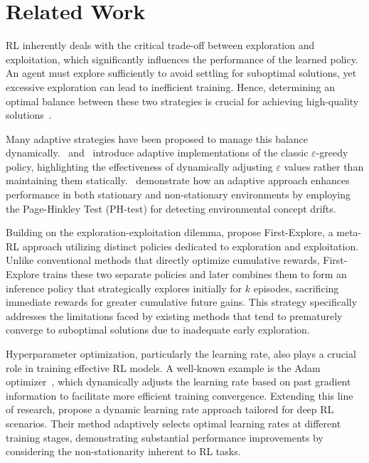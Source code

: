 
\section{Related Work}
\label{sec:related}

\ac{RL} inherently deals with the critical trade-off between exploration and exploitation, which 
significantly influences the performance of the learned policy. An agent must explore sufficiently to 
avoid settling for suboptimal solutions, yet excessive exploration can lead to inefficient training. 
Hence, determining an optimal balance between these two strategies is crucial for achieving 
high-quality solutions~\cite{sutton98}.

Many adaptive strategies have been proposed to manage this balance dynamically.~\citet{tokic2010} 
and~\citet{mignon2017adaptive} introduce adaptive implementations of the classic 
$\varepsilon$-greedy policy, highlighting the effectiveness of dynamically adjusting $\varepsilon$ values 
rather than maintaining them statically.~\citet{mignon2017adaptive} demonstrate how an adaptive 
approach enhances performance in both stationary and non-stationary environments by employing 
the Page-Hinkley Test (PH-test) for detecting environmental concept drifts.

Building on the exploration-exploitation dilemma, \citet{norman2024firstexploreexploitmetalearningsolve} 
propose First-Explore, a meta-\ac{RL} approach utilizing distinct policies dedicated to exploration 
and exploitation. Unlike conventional methods that directly optimize cumulative rewards, First-Explore 
trains these two separate policies and later combines them to form an inference policy that strategically 
explores initially for $k$ episodes, sacrificing immediate rewards for greater cumulative future gains. 
This strategy specifically addresses the limitations faced by existing methods that tend to prematurely 
converge to suboptimal solutions due to inadequate early exploration.

Hyperparameter optimization, particularly the learning rate, also plays a crucial role in training 
effective \ac{RL} models. A well-known example is the Adam 
optimizer~\cite{kingma2017adammethodstochasticoptimization}, which dynamically adjusts the learning 
rate based on past gradient information to facilitate more efficient training convergence. Extending 
this line of research, \citet{dynamicrlalpha} propose a dynamic learning rate approach tailored for deep 
\ac{RL} scenarios. Their method adaptively selects optimal learning rates at different training stages, 
demonstrating substantial performance improvements by considering the non-stationarity inherent to 
\ac{RL} tasks.

